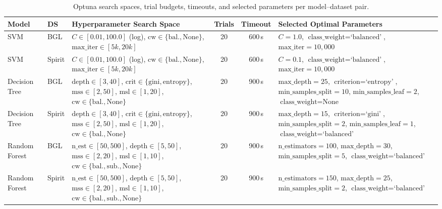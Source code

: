 \documentclass{elektr}
\begin{document}
\begin{table}[htbp]
\caption{Optuna search spaces, trial budgets, timeouts, and selected parameters per model--dataset pair.}
\begin{center}
\footnotesize
\setlength{\tabcolsep}{2.5pt}
\begin{tabular}{|l|l|p{4.8cm}|c|c|p{4.8cm}|}
\hline
\textbf{Model} & \textbf{DS} & \textbf{Hyperparameter Search Space} & \textbf{Trials} & \textbf{Timeout} & \textbf{Selected Optimal Parameters} \\
\hline
SVM & BGL & $C\in[0.01, 100.0]$ (log), $\text{cw}\in\{\text{bal.}, \text{None}\}$, $\text{max\_iter}\in[5k, 20k]$ & 20 & 600\,s & $C=1.0$, $\text{class\_weight}=\text{`balanced'}$, $\text{max\_iter}=10{,}000$ \\
SVM & Spirit & $C\in[0.01, 100.0]$ (log), $\text{cw}\in\{\text{bal.}, \text{None}\}$, $\text{max\_iter}\in[5k, 20k]$ & 20 & 600\,s & $C=0.1$, $\text{class\_weight}=\text{`balanced'}$, $\text{max\_iter}=10{,}000$ \\
Decision Tree & BGL & $\text{depth}\in[3, 40]$, $\text{crit}\in\{\text{gini}, \text{entropy}\}$, $\text{mss}\in[2, 50]$, $\text{msl}\in[1, 20]$, $\text{cw}\in\{\text{bal.}, \text{None}\}$ & 20 & 900\,s & $\text{max\_depth}=25$, $\text{criterion}=\text{`entropy'}$, $\text{min\_samples\_split}=10$, $\text{min\_samples\_leaf}=2$, $\text{class\_weight}=\text{None}$ \\
Decision Tree & Spirit & $\text{depth}\in[3, 40]$, $\text{crit}\in\{\text{gini}, \text{entropy}\}$, $\text{mss}\in[2, 50]$, $\text{msl}\in[1, 20]$, $\text{cw}\in\{\text{bal.}, \text{None}\}$ & 20 & 900\,s & $\text{max\_depth}=15$, $\text{criterion}=\text{`gini'}$, $\text{min\_samples\_split}=2$, $\text{min\_samples\_leaf}=1$, $\text{class\_weight}=\text{`balanced'}$ \\
Random Forest & BGL & $\text{n\_est}\in[50, 500]$, $\text{depth}\in[5, 50]$, $\text{mss}\in[2, 20]$, $\text{msl}\in[1, 10]$, $\text{cw}\in\{\text{bal.}, \text{sub.}, \text{None}\}$ & 20 & 900\,s & $\text{n\_estimators}=100$, $\text{max\_depth}=30$, $\text{min\_samples\_split}=5$, $\text{class\_weight}=\text{`balanced'}$ \\
Random Forest & Spirit & $\text{n\_est}\in[50, 500]$, $\text{depth}\in[5, 50]$, $\text{mss}\in[2, 20]$, $\text{msl}\in[1, 10]$, $\text{cw}\in\{\text{bal.}, \text{sub.}, \text{None}\}$ & 20 & 900\,s & $\text{n\_estimators}=150$, $\text{max\_depth}=25$, $\text{min\_samples\_split}=2$, $\text{class\_weight}=\text{`balanced'}$ \\

\end{tabular}
\end{center}
\end{table}
\end{document}
